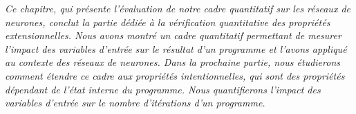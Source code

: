 \frenchdiv


\emph{Ce chapitre, qui présente l'évaluation de notre cadre quantitatif sur les réseaux de neurones, conclut la partie dédiée à la vérification quantitative des propriétés extensionnelles. Nous avons montré un cadre quantitatif permettant de mesurer l'impact des variables d'entrée sur le résultat d'un programme et l'avons appliqué au contexte des réseaux de neurones. Dans la prochaine partie, nous étudierons comment étendre ce cadre aux propriétés intentionnelles, qui sont des propriétés dépendant de l'état interne du programme. Nous quantifierons l'impact des variables d'entrée sur le nombre d'itérations d'un programme.}
